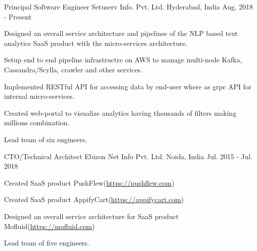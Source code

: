 

\begin{cventries}

  \cventry
    {Principal Software Engineer} %
    {Setuserv Info. Pvt. Ltd.} %
    {Hyderabad, India} %
    {Aug. 2018 - Present} %
    {
      \begin{cvitems} %
        \item {Designed an overall service architecture and pipelines of the NLP based text analytics SaaS product with the micro-services architecture.}
        \item {Setup end to end pipeline infrastructre on AWS to manage multi-node Kafka, Cassandra/Scylla, crawler and other services.}
        \item {Implemented RESTful API for accessing data by end-user where as grpc API for internal micro-services.} 
        \item {Created web-portal to visualize analytics having thousands of filters making millions combination.}
        \item {Lead team of six engineers.}
      \end{cvitems}
    }

  \cventry
    {CTO/Technical Architect} %
    {Ebizon Net Info Pvt. Ltd.} %
    {Noida, India} %
    {Jul. 2015 - Jul. 2018} %
    {
      \begin{cvitems} %
        \item {Created SaaS product PushFlew(\href{https://pushflew.com}{https://pushflew.com})}
        \item {Created SaaS product AppifyCart(\href{https://appifycart.com}{https://appifycart.com})}
        \item {Designed an overall service architecture for SaaS product Mofluid(\href{https://mofluid.com}{https://mofluid.com})}
        \item {Lead team of five engineers.}
      \end{cvitems}
    }


\end{cventries}
